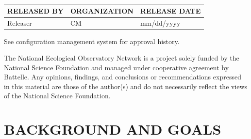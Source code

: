 \documentclass[
  11pt,
]{article}
\begin{document}
\setlength{\extrarowheight}{1mm}
\begin{tabular}{|m{5.5cm}|m{5.5cm}|m{5.5cm}|}
\hline
\textbf{RELEASED BY} &\textbf{ORGANIZATION}  &\textbf{RELEASE DATE} \\ \hline
Releaser & CM        &  mm/dd/yyyy \\ \hline
\end{tabular}

\vspace{1.5in}

\begin{center}
See configuration management system for approval history.

\bigskip



\scriptsize{The National Ecological Observatory Network is a project solely funded by the National Science Foundation and managed under cooperative agreement by Battelle. Any opinions, findings, and conclusions or recommendations expressed in this material are those of the author(s) and do not necessarily reflect the views of the National Science Foundation.}
\end{center}


\newpage

\vspace{3in}

\newpage
{}
\fancyfoot[C]{\thepage}
\fancyfoot[L]{
\footnotesize{}
}

\renewcommand\contentsname{\uppercase{Table of contents}}
\tableofcontents
\fancyfoot[C]{\thepage}
\renewcommand\listtablename{\uppercase{list of tables and figures}}
\let\oldnumberline\numberline
\renewcommand{\numberline}{\tablename~\oldnumberline}
\listoftables
\fancyfoot[C]{\thepage}
\renewcommand{\numberline}{\figurename~\oldnumberline}
\renewcommand\listfigurename{}
\listoffigures
\fancyfoot[C]{\thepage}

\newpage


\newcommand{\changeMe}[1]{\textcolor{red}{#1}}

\section{\uppercase{Background and goals}}
\end{document}
